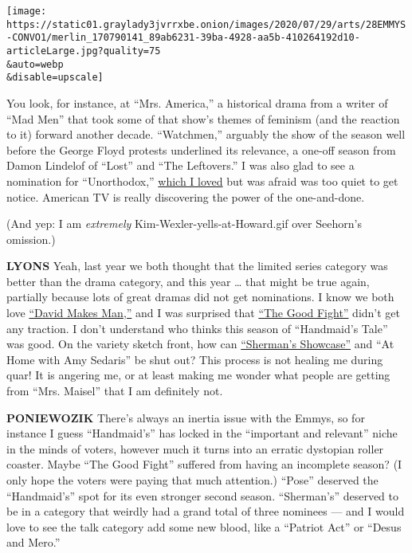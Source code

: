 \texttt{[image: https://static01.graylady3jvrrxbe.onion/images/2020/07/29/arts/28EMMYS-CONVO1/merlin\_170790141\_89ab6231-39ba-4928-aa5b-410264192d10-articleLarge.jpg?quality=75\\\&auto=webp\\\&disable=upscale]}

You look, for instance, at ``Mrs. America,'' a historical drama from a
writer of ``Mad Men'' that took some of that show's themes of feminism
(and the reaction to it) forward another decade. ``Watchmen,'' arguably
the show of the season well before the George Floyd protests underlined
its relevance, a one-off season from Damon Lindelof of ``Lost'' and
``The Leftovers.'' I was also glad to see a nomination for
``Unorthodox,''
\href{https://www.nytimes3xbfgragh.onion/2020/03/25/arts/television/unorthodox-review-netflix.html}{which
I loved} but was afraid was too quiet to get notice. American TV is
really discovering the power of the one-and-done.

(And yep: I am \emph{extremely} Kim-Wexler-yells-at-Howard.gif over
Seehorn's omission.)

\textbf{LYONS} Yeah, last year we both thought that the limited series
category was better than the drama category, and this year \ldots{} that
might be true again, partially because lots of great dramas did not get
nominations. I know we both love
\href{https://www.nytimes3xbfgragh.onion/2020/07/23/arts/television/david-makes-man-hbo-max.html}{``David
Makes Man,''} and I was surprised that
\href{https://www.nytimes3xbfgragh.onion/2020/04/09/arts/television/the-good-fight-premiere.html}{``The
Good Fight''} didn't get any traction. I don't understand who thinks
this season of ``Handmaid's Tale'' was good. On the variety sketch
front, how can
\href{https://www.nytimes3xbfgragh.onion/2019/07/23/arts/television/south-side-shermans-showcase-review.html}{``Sherman's
Showcase''} and ``At Home with Amy Sedaris'' be shut out? This process
is not healing me during quar! It is angering me, or at least making me
wonder what people are getting from ``Mrs. Maisel'' that I am definitely
not.

\textbf{PONIEWOZIK} There's always an inertia issue with the Emmys, so
for instance I guess ``Handmaid's'' has locked in the ``important and
relevant'' niche in the minds of voters, however much it turns into an
erratic dystopian roller coaster. Maybe ``The Good Fight'' suffered from
having an incomplete season? (I only hope the voters were paying that
much attention.) ``Pose'' deserved the ``Handmaid's'' spot for its even
stronger second season. ``Sherman's'' deserved to be in a category that
weirdly had a grand total of three nominees --- and I would love to see
the talk category add some new blood, like a ``Patriot Act'' or ``Desus
and Mero.''


